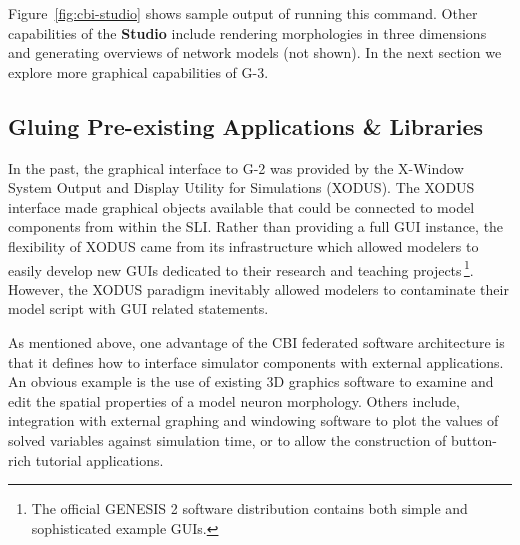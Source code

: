 \documentclass[12pt]{article}
\begin{document}
Figure~\ref{fig:cbi-studio} shows sample output of running this
command.  Other capabilities of the {\bf Studio} include rendering
morphologies in three dimensions and generating overviews of network
models (not shown).  In the next section we explore more graphical
capabilities of G-3.

\subsection{Gluing Pre-existing Applications \& Libraries}

In the past, the graphical interface to G-2 was provided by the
X-Window System Output and Display Utility for Simulations (XODUS).  The
XODUS interface made graphical objects available that could be
connected to model components from within the SLI.  Rather than
providing a full GUI instance, the flexibility of XODUS came from its
infrastructure which allowed modelers to easily develop new GUIs
dedicated to their research and teaching projects\,\footnote{The
  official GENESIS 2 software distribution contains both simple and
  sophisticated example GUIs.}.  However, the XODUS paradigm
inevitably allowed modelers to contaminate their model script with GUI
related statements.

As mentioned above, one advantage of the CBI federated software
architecture is that it defines how to interface simulator components
with external applications.  An obvious example is the use of existing
3D graphics software to examine and edit the spatial properties of a
model neuron morphology.  Others include, integration with external
graphing and windowing software to plot the values of solved
variables against simulation time, or to allow the construction of
button-rich tutorial applications.
\end{document}
